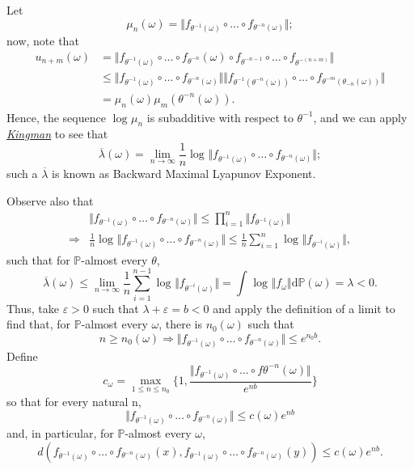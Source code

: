 \documentclass[../stationary_ifs.tex]{subfiles}
\begin{document}
\begin{proof*}
	Let
	\[
		\mu_{n}(\omega ) = \Vert f_{\theta^{-1}(\omega )}\circ \dotsc \circ f_{\theta^{-n}(\omega )} \Vert;
	\]
	now, note that
	\begin{align*}
		u_{n+m}(\omega ) & = \Vert f_{\theta^{-1}(\omega )}\circ \dotsc \circ f_{\theta^{-n}}(\omega )\circ f_{\theta^{-n-1}}\circ \dotsc \circ f_{\theta^{-(n+m)}} \Vert                                                \\
		                 & \leq \Vert f_{\theta^{-1}(\omega )}\circ \dotsc \circ f_{\theta^{-n}(\omega )} \Vert\Vert f_{\theta^{-1}(\theta^{-n}(\omega ))}\circ \dotsc \circ f_{\theta^{-m}(\theta_{-n}(\omega ))} \Vert \\
		                 & = \mu_{n}(\omega )\mu_{m}(\theta^{-n}(\omega )).
	\end{align*}
	Hence, the sequence \(\log^{}{}\mu_{n}\) is subadditive with respect to \(\theta^{-1}\), and we can apply \hyperlink{kingman_ergodic}{\textit{Kingman}} to see that
	\[
		\overline{\lambda }(\omega ) = \lim_{n\to \infty}\frac{1}{n}\log^{}{}\Vert f_{\theta^{-1}(\omega )}\circ \dotsc \circ f_{\theta^{-n}(\omega )} \Vert;
	\]
	such a \(\overline{\lambda }\) is known as \hypertarget{backward_lyapunov_exponent}{Backward Maximal Lyapunov Exponent}.

	Observe also that
	\begin{align*}
		            & \Vert f_{\theta^{-1}(\omega )}\circ \dotsc \circ f_{\theta^{-n}(\omega )} \Vert\leq \prod\limits_{i=1}^{n}\Vert f_{\theta^{-1}(\omega )} \Vert                                          \\
		\Rightarrow & \frac{1}{n}\log^{}{}\Vert f_{\theta^{-1}(\omega )}\circ \dotsc \circ f_{\theta^{-n}(\omega )} \Vert \leq \frac{1}{n}\sum\limits_{i=1}^{n}\log^{}{}\Vert f_{\theta^{-i}(\omega )} \Vert,
	\end{align*}
	such that for \(\mathbb{P}\)-almost every \(\theta \),
	\[
		\overline{\lambda }(\omega )\leq \lim_{n\to \infty}\frac{1}{n}\sum\limits_{i=1}^{n-1}\log^{}{}\Vert f_{\theta^{-i}(\omega )} \Vert = \int_{}^{}\log^{}{}\Vert f_{\omega } \Vert \mathrm{d}\mathbb{P}(\omega ) = \lambda < 0.
	\]
	Thus, take \(\varepsilon > 0\) such that \(\lambda + \varepsilon  = b < 0\) and apply the definition of a limit to find that, for \(\mathbb{P}\)-almost every \(\omega \), there is \(n_{0}(\omega )\) such that
	\[
		n \geq n_{0}(\omega ) \Rightarrow \Vert f_{\theta^{-1}(\omega )}\circ \dotsc \circ f_{\theta^{-n}(\omega )} \Vert\leq e^{n_{0}b}.
	\]
	Define
	\[
		c_{\omega }=\max\limits_{1\leq n\leq n_{0}}\biggl\{1, \frac{\Vert f_{\theta^{-1}(\omega )}\circ \dotsc \circ f{\theta^{-n}(\omega )} \Vert}{e^{nb}}\biggr\}
	\]
	so that for every natural n,
	\[
		\Vert f_{\theta^{-1}(\omega )}\circ \dotsc \circ f_{\theta^{-n}(\omega )} \Vert\leq c(\omega )e^{nb}
	\]
	and, in particular, for \(\mathbb{P}\)-almost every \(\omega \),
	\[
		d(f_{\theta^{-1}(\omega)}\circ \dotsc \circ f_{\theta^{-n}(\omega )}(x), f_{\theta^{-1}(\omega )}\circ \dotsc \circ f_{\theta^{-n}(\omega )}(y))\leq c(\omega )e^{nb}.
	\]


\end{proof*}
\end{document}
